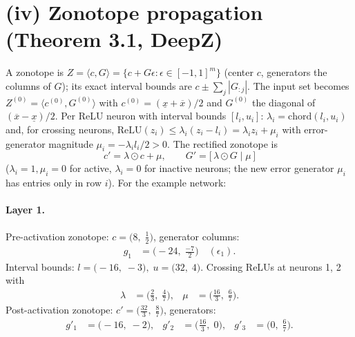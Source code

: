 \documentclass[11pt]{article}
\begin{document}
\section{(iv) Zonotope propagation (Theorem 3.1, DeepZ)}
A zonotope is $Z = \langle c, G \rangle = \{c + G\epsilon : \epsilon \in [-1,1]^m\}$
(center $c$, generators the columns of $G$); its exact interval bounds are
$c \pm \sum_j |G_{:j}|$. The input set becomes $Z^{(0)} = \langle c^{(0)}, G^{(0)} \rangle$ with
$c^{(0)} = (\underline{x} + \overline{x})/2$ and $G^{(0)}$ the diagonal of $(\overline{x} - \underline{x})/2$.
Per ReLU neuron with interval bounds $[l_i, u_i]$:
$\lambda_i = \mathrm{chord}(l_i, u_i)$ and, for crossing neurons,
$\mathrm{ReLU}(z_i) \le \lambda_i (z_i - l_i) = \lambda_i z_i + \mu_i$ with error-generator magnitude
$\mu_i = -\lambda_i l_i / 2 > 0$. The rectified zonotope is
\begin{equation*}
c' = \lambda \odot c + \mu, \qquad G' = \bigl[\, \lambda \odot G \;\big|\; \mu\, \bigr]
\end{equation*}
($\lambda_i = 1, \mu_i = 0$ for active, $\lambda_i = 0$ for inactive neurons;
the new error generator $\mu_i$ has entries only in row $i$).
For the example network:
\paragraph{Layer 1.}
Pre-activation zonotope: $c = \bigl(8,\; \frac{1}{2}\bigr)$, generator columns:
\begin{align*}
g_{1} &= \bigl(-24,\; \frac{-7}{2}\bigr) \quad (\epsilon_{1}).
\end{align*}
Interval bounds: $l = \bigl(-16,\; -3\bigr), \; u = \bigl(32,\; 4\bigr)$. 
Crossing ReLUs at neurons 1, 2 with
\begin{align*}
\lambda &= \bigl(\frac{2}{3},\; \frac{4}{7}\bigr), & \mu &= \bigl(\frac{16}{3},\; \frac{6}{7}\bigr).
\end{align*}
Post-activation zonotope: $c' = \bigl(\frac{32}{3},\; \frac{8}{7}\bigr)$, generators:
\begin{align*}
g'_{1} &= \bigl(-16,\; -2\bigr), &
g'_{2} &= \bigl(\frac{16}{3},\; 0\bigr), &
g'_{3} &= \bigl(0,\; \frac{6}{7}\bigr).
\end{align*}
\end{document}
